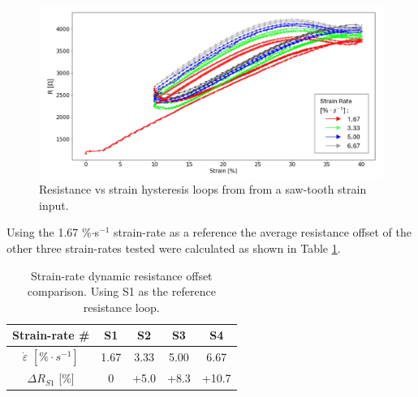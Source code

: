 \begin{figure}[H]
	\centering
	\includegraphics[width=\linewidth]{Figures/hysteresis_strain_varSpeeds_ledge_corrected.jpg}
	\caption{Resistance vs strain hysteresis loops from from a saw-tooth strain input.}
	\label{fig:saw-tooth-hysteresis-loops}
\end{figure}
Using the 1.67 \%$\cdot$s$^{-1}$ strain-rate as a reference the average resistance offset of the other three strain-rates tested were calculated as shown in Table \ref{tab:rel-dR-strain-rate}.
\begin{table}[H]
	\centering
	\caption{Strain-rate dynamic resistance offset comparison. Using S1 as the reference resistance loop.}
	\label{tab:rel-dR-strain-rate}
	\begin{tabular}{c|cccc}
		Strain-rate \# & S1 & S2 & S3 & S4 \\
		\hline
		$\dot\varepsilon$ $[\%\cdot s^{-1}]$ & 1.67 & 3.33 & 5.00 & 6.67 \\
		\hline
		$\Delta R_{S1}$ [\%] & 0 & +5.0 & +8.3 & +10.7 \\
	\end{tabular}
\end{table}


